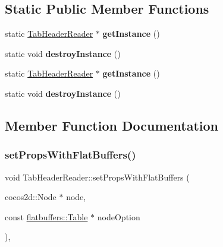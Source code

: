 \subsection*{Static Public Member Functions}
\begin{DoxyCompactItemize}
\item 
\mbox{\label{classTabHeaderReader_aea226cb660ad1c7c9465bb1743a83169}} 
static \hyperlink{classTabHeaderReader}{Tab\+Header\+Reader} $\ast$ {\bfseries get\+Instance} ()
\item 
\mbox{\label{classTabHeaderReader_afe563edbf7572565b10fefa6a1c4a126}} 
static void {\bfseries destroy\+Instance} ()
\item 
\mbox{\label{classTabHeaderReader_a04892a687cd18675178a0d787ec19af4}} 
static \hyperlink{classTabHeaderReader}{Tab\+Header\+Reader} $\ast$ {\bfseries get\+Instance} ()
\item 
\mbox{\label{classTabHeaderReader_a730b98231b4c4003f9abe4ab5d4745e2}} 
static void {\bfseries destroy\+Instance} ()
\end{DoxyCompactItemize}


\subsection{Member Function Documentation}
\mbox{\label{classTabHeaderReader_a856933949dd39261b44129db1e572e8d}} 
\subsubsection{\texorpdfstring{set\+Props\+With\+Flat\+Buffers()}{setPropsWithFlatBuffers()}}
{\footnotesize\ttfamily void Tab\+Header\+Reader\+::set\+Props\+With\+Flat\+Buffers (\begin{DoxyParamCaption}\item[{cocos2d\+::\+Node $\ast$}]{node,  }\item[{const \hyperlink{classflatbuffers_1_1Table}{flatbuffers\+::\+Table} $\ast$}]{node\+Option }\end{DoxyParamCaption})\hspace{0.3cm}{\ttfamily [override]}, {\ttfamily [virtual]}}

